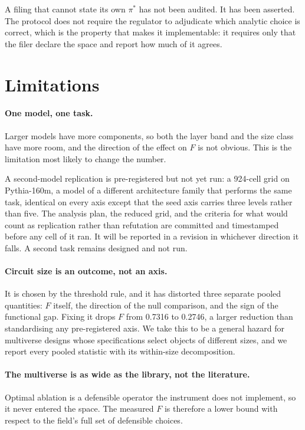 \documentclass[11pt]{article}
\begin{document}
\noindent
A filing that cannot state its own $\pi^{*}$ has not been audited. It has been
asserted. The protocol does not require the regulator to adjudicate which analytic
choice is correct, which is the property that makes it implementable: it requires
only that the filer declare the space and report how much of it agrees.

\section{Limitations}

\paragraph{One model, one task.} Larger models have more components, so both the
layer band and the size class have more room, and the direction of the effect on
$F$ is not obvious. This is the limitation most likely to change the number.

A second-model replication is pre-registered but not yet run: a 924-cell grid on
Pythia-160m, a model of a different architecture family that performs the same
task, identical on every axis except that the seed axis carries three levels
rather than five. The analysis plan, the reduced grid, and the criteria for what
would count as replication rather than refutation are committed and timestamped
before any cell of it ran. It will be reported in a revision in whichever
direction it falls. A second task remains designed and not run.

\paragraph{Circuit size is an outcome, not an axis.} It is chosen by the threshold
rule, and it has distorted three separate pooled quantities: $F$ itself, the
direction of the null comparison, and the sign of the functional gap. Fixing it
drops $F$ from 0.7316 to 0.2746, a larger reduction than standardising any
pre-registered axis. We take this to be a general hazard for multiverse designs
whose specifications select objects of different sizes, and we report every pooled
statistic with its within-size decomposition.

\paragraph{The multiverse is as wide as the library, not the literature.} Optimal
ablation \citep{li2024} is a defensible operator the instrument does not
implement, so it never entered the space. The measured $F$ is therefore a lower
bound with respect to the field's full set of defensible choices.
\end{document}
